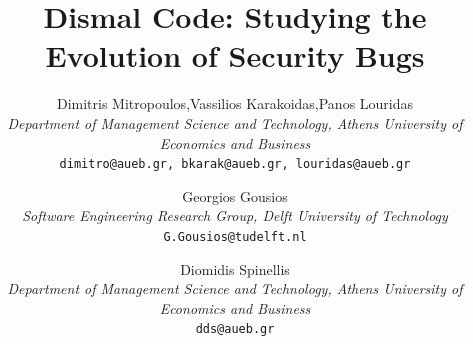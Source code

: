 \documentclass[letterpaper,twocolumn,10pt]{article}
\begin{document}
\date{}

\title{\Large \bf Dismal Code: Studying the Evolution of Security Bugs}

\author{
{\rm Dimitris Mitropoulos,Vassilios Karakoidas,Panos Louridas}\\
{\it Department of Management Science and Technology,
Athens University of Economics and Business}\\
{\tt dimitro@aueb.gr, bkarak@aueb.gr, louridas@aueb.gr}
\and
{\rm Georgios Gousios}\\
{\it Software Engineering Research Group,
Delft University of Technology}\\
{\tt G.Gousios@tudelft.nl}
\and
{\rm Diomidis Spinellis}\\
{\it Department of Management Science and Technology,
Athens University of Economics and Business}\\
{\tt dds@aueb.gr}
} 

\maketitle
\thispagestyle{empty}
\end{document}

